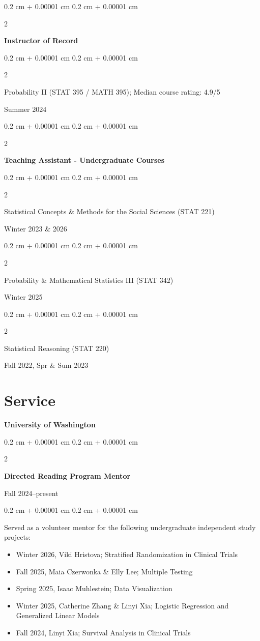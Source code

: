 \documentclass[10pt, letterpaper]{article}
\newenvironment{highlights}{
    \begin{itemize}[
        topsep=0.10 cm,
        parsep=0.10 cm,
        partopsep=0pt,
        itemsep=0pt,
        leftmargin=0.4 cm + 10pt
    ]
}{
    \end{itemize}
} %
\newenvironment{onecolentry}{
    \begin{adjustwidth}{
        0.2 cm + 0.00001 cm
    }{
        0.2 cm + 0.00001 cm
    }
}{
    \end{adjustwidth}
    \vspace{0.2cm} %
}
\newenvironment{twocolentry}[2][]{
    \onecolentry
    \def\secondColumn{#2}
    \setcolumnwidth{\fill, 4.5 cm}
    \begin{paracol}{2}
}{
    \switchcolumn \raggedleft \secondColumn
    \end{paracol}
    \endonecolentry
}
\begin{document}
\begin{twocolentry}{}
    \textbf{Instructor of Record}
\end{twocolentry}
\begin{twocolentry}{Summer 2024}
    \hspace{3 mm} Probability II (STAT 395 / MATH 395); Median course rating: 4.9/5
\end{twocolentry}



\begin{twocolentry}{}
    \textbf{Teaching Assistant - Undergraduate Courses}
\end{twocolentry}
\begin{twocolentry}{Winter 2023 \& 2026}
    \hspace{3 mm} Statistical Concepts \& Methods for the Social Sciences (STAT 221)
\end{twocolentry}
\begin{twocolentry}{Winter 2025}
    \hspace{3 mm} Probability \& Mathematical Statistics III (STAT 342)
\end{twocolentry}
\begin{twocolentry}{Fall 2022, Spr \& Sum 2023}
    \hspace{3 mm} Statistical Reasoning (STAT 220)
\end{twocolentry}


\newpage

\section{Service}

\textbf{University of Washington}

\vspace{3 mm}


\begin{twocolentry}{Fall 2024--present}
    \textbf{Directed Reading Program Mentor} 
\end{twocolentry}
\begin{onecolentry}
Served as a volunteer mentor for the following undergraduate independent study projects:
    \begin{highlights}
        \item[] Winter 2026, Viki Hristova; Stratified Randomization in Clinical Trials 
        \item[] Fall 2025, Maia Czerwonka \& Elly Lee; Multiple Testing
        \item[] Spring 2025, Isaac Muhlestein; Data Visualization
        \item[] Winter 2025, Catherine Zhang \& Linyi Xia; Logistic Regression and Generalized Linear Models
        \item[] Fall 2024, Linyi Xia; Survival Analysis in Clinical Trials
    \end{highlights}
\end{onecolentry}
\end{document}
